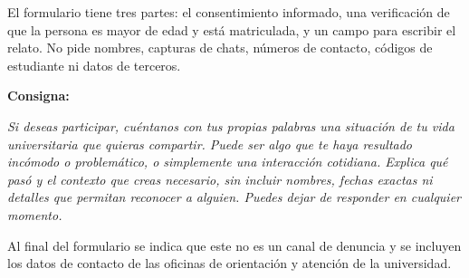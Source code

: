 
El formulario tiene tres partes: el consentimiento informado, una verificación de que la persona es mayor de edad y está matriculada, y un campo para escribir el relato. No pide nombres, capturas de chats, números de contacto, códigos de estudiante ni datos de terceros.

\vspace{0.4cm}
\noindent\textbf{Consigna:}

\begin{tcolorbox}[colback=gray!5, colframe=gray!50, arc=2pt, boxrule=0.5pt]
\itshape
Si deseas participar, cuéntanos con tus propias palabras una situación de tu vida universitaria que quieras compartir. Puede ser algo que te haya resultado incómodo o problemático, o simplemente una interacción cotidiana. Explica qué pasó y el contexto que creas necesario, sin incluir nombres, fechas exactas ni detalles que permitan reconocer a alguien. Puedes dejar de responder en cualquier momento.
\end{tcolorbox}

\vspace{0.4cm}
Al final del formulario se indica que este no es un canal de denuncia y se incluyen los datos de contacto de las oficinas de orientación y atención de la universidad.
